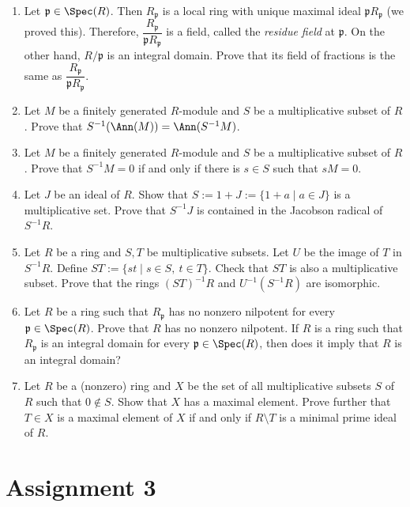 \begin{enumerate}[label=\arabic*.]
\item Let $\mathfrak p \in \Spec(R)$. Then $R_{\mathfrak p}$ is a local ring with unique maximal ideal $\mathfrak p R_{\mathfrak p}$ (we proved this). Therefore, $\dfrac{R_{\mathfrak p}}{\mathfrak p R_{\mathfrak p}}$ is a field, called the \emph{residue field} at $\mathfrak p$. On the other hand, $R/\mathfrak p$ is an integral domain. Prove that its field of fractions is the same as $\dfrac{R_{\mathfrak p}}{\mathfrak p R_{\mathfrak p}}$.

\item Let $M$ be a finitely generated $R$-module and $S$ be a multiplicative subset of $R$. Prove that $S^{-1}(\Ann(M)) = \Ann(S^{-1}M)$.

\item Let $M$ be a finitely generated $R$-module and $S$ be a multiplicative subset of $R$. Prove that $S^{-1}M = 0$ if and only if there is $s \in S$ such that $sM=0$.

\item Let $J$ be an ideal of $R$. Show that $S := 1+J := \{1+a \mid a \in J\}$ is a multiplicative set. Prove that $S^{-1}J$ is contained in the Jacobson radical of $S^{-1}R$.

\item Let $R$ be a ring and $S,T$ be multiplicative subsets. Let $U$ be the image of $T$ in $S^{-1}R$. Define $ST := \{st \mid s \in S,\ t \in T\}$. Check that $ST$ is also a multiplicative subset. Prove that the rings $(ST)^{-1}R$ and $U^{-1}(S^{-1}R)$ are isomorphic.

\item Let $R$ be a ring such that $R_{\mathfrak p}$ has no nonzero nilpotent for every $\mathfrak p \in \Spec(R)$. Prove that $R$ has no nonzero nilpotent. If $R$ is a ring such that $R_{\mathfrak p}$ is an integral domain for every $\mathfrak p \in \Spec(R)$, then does it imply that $R$ is an integral domain?

\item Let $R$ be a (nonzero) ring and $X$ be the set of all multiplicative subsets $S$ of $R$ such that $0 \notin S$. Show that $X$ has a maximal element. Prove further that $T \in X$ is a maximal element of $X$ if and only if $R \setminus T$ is a minimal prime ideal of $R$.

\end{enumerate}

\section{Assignment 3}

